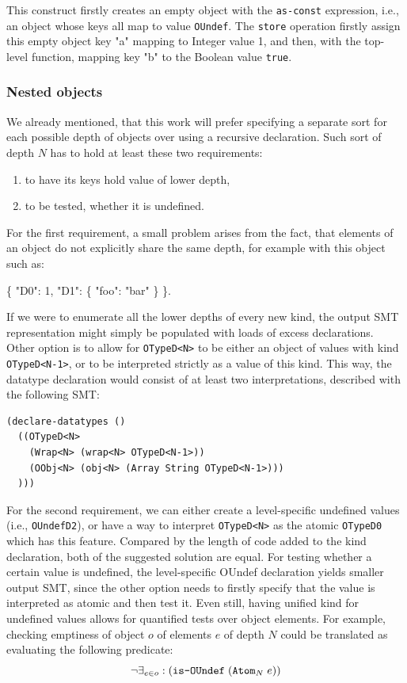   This construct firstly creates an empty object with the \texttt{as-const} expression, i.e., an object whose keys all map to value \texttt{OUndef}.
  The \texttt{store} operation firstly assign this empty object key "a" mapping to Integer value 1, and then, with the top-level function, mapping key "b" to the Boolean value \texttt{true}.

\subsubsection{Nested objects}

We already mentioned, that this work will prefer specifying a separate sort for each possible depth of objects over using a recursive declaration.
Such sort of depth $N$ has to hold at least these two requirements:
  \begin{enumerate}
    \item to have its keys hold value of lower depth,
    \item to be tested, whether it is undefined.
  \end{enumerate}
For the first requirement, a small problem arises from the fact, that elements of an object do not explicitly share the same depth, for example with this object such as:
\begin{center}
  \{ "D0": 1, "D1": \{ "foo": "bar" \} \}.
\end{center}
If we were to enumerate all the lower depths of every new kind, the output SMT representation might simply be populated with loads of excess declarations.
  Other option is to allow for \texttt{OTypeD<N>} to be either an object of values with kind \texttt{OTypeD<N-1>}, or to be interpreted strictly as a value of this kind.
  This way, the datatype declaration would consist of at least two interpretations, described with the following SMT:

\begin{lstlisting}[language=lisp]
(declare-datatypes ()
  ((OTypeD<N>
    (Wrap<N> (wrap<N> OTypeD<N-1>))
    (OObj<N> (obj<N> (Array String OTypeD<N-1>)))
  )))
\end{lstlisting}

  For the second requirement, we can either create a level-specific undefined values (i.e., \texttt{OUndefD2}), or have a way to interpret \texttt{OTypeD<N>} as the atomic \texttt{OTypeD0} which has this feature.
  Compared by the length of code added to the kind declaration, both of the suggested solution are equal.
  For testing whether a certain value is undefined, the level-specific OUndef declaration yields smaller output SMT, since the other option needs to firstly specify that the value is interpreted as atomic and then test it.
  Even still, having unified kind for undefined values allows for quantified tests over object elements.
  For example, checking emptiness of object $o$ of elements $e$ of depth $N$ could be translated as evaluating the following predicate:
  $$
  \neg\exists_{e \in o}: (\texttt{is-OUndef} \hspace{1mm} (\texttt{Atom}_N \hspace{1mm} e))
  $$
  
